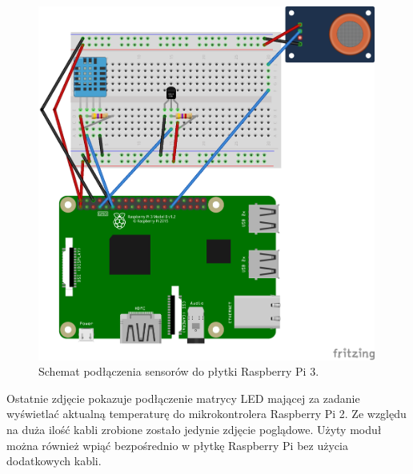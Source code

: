 \documentclass[12pt]{report}
\begin{document}
{\begin{figure}[h]
	\centering
	\includegraphics[width=0.99\textwidth]{images/rpi-master.png}
	\caption{Schemat podłączenia sensorów do płytki Raspberry Pi 3.}
\end{figure}
\FloatBarrier	

Ostatnie zdjęcie pokazuje podłączenie matrycy LED mającej za zadanie wyświetlać aktualną temperaturę do mikrokontrolera Raspberry Pi 2. Ze względu na duża ilość kabli zrobione zostało jedynie zdjęcie poglądowe. Użyty moduł można również wpiąć bezpośrednio w płytkę Raspberry Pi bez użycia dodatkowych kabli. 

}
\end{document}
